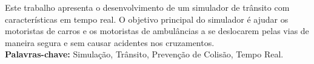 \begin{resumo}

Este trabalho apresenta o desenvolvimento de um simulador de trânsito com características em tempo real. O objetivo principal do simulador é ajudar os motoristas de carros e os motoristas de ambulâncias a se deslocarem pelas vias de maneira segura e sem causar acidentes nos cruzamentos.\\

  \textbf{Palavras-chave:} Simulação, Trânsito, Prevenção de Colisão, Tempo Real.
\end{resumo}
